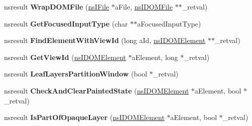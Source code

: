 \begin{DoxyCompactItemize}
\item 
\mbox{\label{interfacens_i_d_o_m_window_utils_a8b8a77c0b8be902cf77d9f5b79cdec7a}} 
nsresult {\bfseries Wrap\+D\+O\+M\+File} (\hyperlink{interfacens_i_file}{ns\+I\+File} $\ast$a\+File, \hyperlink{interfacens_i_supports}{ns\+I\+D\+O\+M\+File} $\ast$$\ast$\+\_\+retval)
\item 
\mbox{\label{interfacens_i_d_o_m_window_utils_a4c661d3f56b5957b50f3be86b82f6844}} 
nsresult {\bfseries Get\+Focused\+Input\+Type} (char $\ast$$\ast$a\+Focused\+Input\+Type)
\item 
\mbox{\label{interfacens_i_d_o_m_window_utils_ac43860a569e5629d0cfa5327a814dea0}} 
nsresult {\bfseries Find\+Element\+With\+View\+Id} (long a\+Id, \hyperlink{interfacens_i_d_o_m_element}{ns\+I\+D\+O\+M\+Element} $\ast$$\ast$\+\_\+retval)
\item 
\mbox{\label{interfacens_i_d_o_m_window_utils_a0723257009f43b4661fab1bdfed477de}} 
nsresult {\bfseries Get\+View\+Id} (\hyperlink{interfacens_i_d_o_m_element}{ns\+I\+D\+O\+M\+Element} $\ast$a\+Element, long $\ast$\+\_\+retval)
\item 
\mbox{\label{interfacens_i_d_o_m_window_utils_aa0ef1f45d0405ee68564362d10894013}} 
nsresult {\bfseries Leaf\+Layers\+Partition\+Window} (bool $\ast$\+\_\+retval)
\item 
\mbox{\label{interfacens_i_d_o_m_window_utils_a0d023ce0f98cf9f8fe7e28e30583bc50}} 
nsresult {\bfseries Check\+And\+Clear\+Painted\+State} (\hyperlink{interfacens_i_d_o_m_element}{ns\+I\+D\+O\+M\+Element} $\ast$a\+Element, bool $\ast$\+\_\+retval)
\item 
\mbox{\label{interfacens_i_d_o_m_window_utils_aa69520b2cafc98818cc9a794b6c1d73a}} 
nsresult {\bfseries Is\+Part\+Of\+Opaque\+Layer} (\hyperlink{interfacens_i_d_o_m_element}{ns\+I\+D\+O\+M\+Element} $\ast$a\+Element, bool $\ast$\+\_\+retval)
\item 
\mbox{\label{interfacens_i_d_o_m_window_utils_ac80b2ab38d2c4288c065afd367c6d90b}} 
$$
\end{DoxyCompactItemize}
